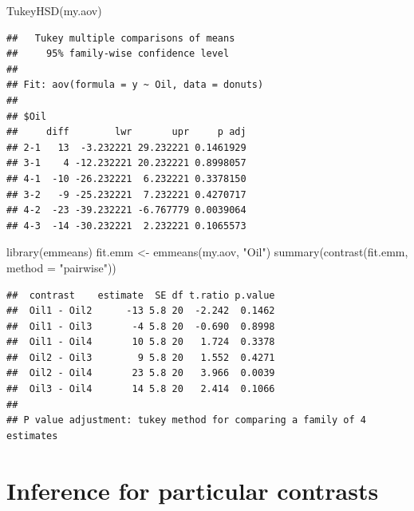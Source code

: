 \documentclass[
]{book}
\newenvironment{Shaded}{\begin{snugshade}}{\end{snugshade}}
\newcommand{\AttributeTok}[1]{\textcolor[rgb]{0.77,0.63,0.00}{#1}}
\newcommand{\FunctionTok}[1]{\textcolor[rgb]{0.00,0.00,0.00}{#1}}
\newcommand{\NormalTok}[1]{#1}
\newcommand{\OtherTok}[1]{\textcolor[rgb]{0.56,0.35,0.01}{#1}}
\newcommand{\StringTok}[1]{\textcolor[rgb]{0.31,0.60,0.02}{#1}}
\begin{document}
\begin{Shaded}
\begin{Highlighting}[]
\FunctionTok{TukeyHSD}\NormalTok{(my.aov)}
\end{Highlighting}
\end{Shaded}

\begin{verbatim}
##   Tukey multiple comparisons of means
##     95% family-wise confidence level
## 
## Fit: aov(formula = y ~ Oil, data = donuts)
## 
## $Oil
##     diff        lwr       upr     p adj
## 2-1   13  -3.232221 29.232221 0.1461929
## 3-1    4 -12.232221 20.232221 0.8998057
## 4-1  -10 -26.232221  6.232221 0.3378150
## 3-2   -9 -25.232221  7.232221 0.4270717
## 4-2  -23 -39.232221 -6.767779 0.0039064
## 4-3  -14 -30.232221  2.232221 0.1065573
\end{verbatim}

\begin{Shaded}
\begin{Highlighting}[]
\FunctionTok{library}\NormalTok{(emmeans) }
\NormalTok{fit.emm }\OtherTok{\textless{}{-}} \FunctionTok{emmeans}\NormalTok{(my.aov, }\StringTok{"Oil"}\NormalTok{)}
\FunctionTok{summary}\NormalTok{(}\FunctionTok{contrast}\NormalTok{(fit.emm, }\AttributeTok{method =} \StringTok{"pairwise"}\NormalTok{))}
\end{Highlighting}
\end{Shaded}

\begin{verbatim}
##  contrast    estimate  SE df t.ratio p.value
##  Oil1 - Oil2      -13 5.8 20  -2.242  0.1462
##  Oil1 - Oil3       -4 5.8 20  -0.690  0.8998
##  Oil1 - Oil4       10 5.8 20   1.724  0.3378
##  Oil2 - Oil3        9 5.8 20   1.552  0.4271
##  Oil2 - Oil4       23 5.8 20   3.966  0.0039
##  Oil3 - Oil4       14 5.8 20   2.414  0.1066
## 
## P value adjustment: tukey method for comparing a family of 4 estimates
\end{verbatim}

\hypertarget{inference-for-particular-contrasts}{%
\section{Inference for particular contrasts}\label{inference-for-particular-contrasts}}
\end{document}
